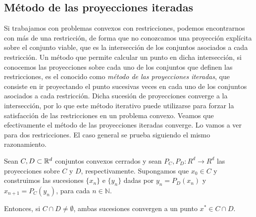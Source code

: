 \subsection{Método de las proyecciones iteradas}

Si trabajamos con problemas convexos con restricciones, podemos encontrarnos con más de una restricción, de forma que no conozcamos una proyección explícita sobre el conjunto viable, que es la intersección de los conjuntos asociados a cada restricción. Un método que permite calcular un punto en dicha intersección, si conocemos las proyecciones sobre cada uno de los conjuntos que definen las restricciones, es el conocido como \emph{método de las proyecciones iteradas}, que consiste en ir proyectando el punto sucesivas veces en cada uno de los conjuntos asociados a cada restricción. Dicha sucesión de proyecciones converge a la intersección, por lo que este método iterativo puede utilizarse para forzar la satisfacción de las restricciones en un problema convexo. Veamos que efectivamente el método de las proyecciones iteradas converge. Lo vamos a ver para dos restricciones. El caso general se prueba siguiendo el mismo razonamiento.

\begin{thm} \label{thm:iter_proj}
    Sean $C, D \subset \mathbb{R}^d$ conjuntos convexos cerrados y sean $P_C, P_D \colon R^d \to R^d$ las proyecciones sobre $C$ y $D$, respectivamente. Supongamos que $x_0 \in C$ y construimos las sucesiones $\{x_n\}$ e $\{y_n\}$ dadas por $y_n = P_D(x_n)$ y $x_{n+1} = P_C(y_n)$, para cada $n \in \mathbb{N}$.

    Entonces, si $C \cap D \ne \emptyset$, ambas sucesiones convergen a un punto $x^* \in C \cap D$.
\end{thm}

